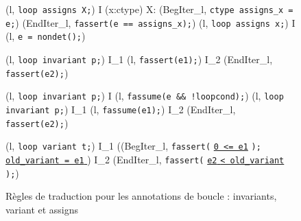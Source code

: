 \begin{figure*}[tb]
  \scriptsize{
  {
    {
      \splitfrac
      {
        (l, \mbox{\lstinline'loop assigns X;'}) 
      }
      {
        I \concat
        \forall (x:ctype) \not \in X:
        (BegIter_l, \mbox{\lstinline'ctype assigns_x = e;'})
        \concat (EndIter_l, \mbox{\lstinline'fassert(e == assigns_x);'})
      }
    }
  }
  {
    {(l, \mbox{\lstinline'loop assigns x;'})
      I \concat (l, \mbox{\lstinline'e = nondet();'})}
  }
  \vspace{-1mm}

 {
    {
      (l, \mbox{\lstinline'loop invariant p;'}) 
      I_1 \concat (l, \mbox{\lstinline'fassert(e1);'})
      \concat I_2 \concat (EndIter_l, \mbox{\lstinline'fassert(e2);'})
    }
  }

 {
    {
      (l, \mbox{\lstinline'loop invariant p;'}) 
      I \concat (l, \mbox{\lstinline'fassume(e && !loopcond);'})
    }
  }
 {
    {
      (l, \mbox{\lstinline'loop invariant p;'}) 
      I_1 \concat (l, \mbox{\lstinline'fassume(e1);'})
      \concat I_2 \concat (EndIter_l, \mbox{\lstinline'fassert(e2);'})
    }
  }
 \vspace{-1mm}

 {
   {
     \splitfrac
         {
           (l, \mbox{\lstinline'loop variant t;'}) 
         }
         {
           I_1 \concat ((BegIter_l,
           \mbox{\lstinline'fassert('}
           \underline{\mbox{\lstinline'0 <= e1'}}
           \mbox{\lstinline');' }
           \underline{\Zinit \mbox{\lstinline'old_variant = e1'} \Zclear}
           \semicolon)
           \concat I_2
           \concat(EndIter_l,
           \mbox{\lstinline'fassert('}
           \underline{\mbox{\lstinline'e2'}\Zclear
             \mbox{\lstinline'< old_variant'} \Zclear}
           \mbox{\lstinline');'})
         }
   }
 }
  }
  \caption{Règles de traduction pour les annotations de boucle : invariants,
    variant et assigns}
  \label{fig:loop-annot}
\end{figure*}


